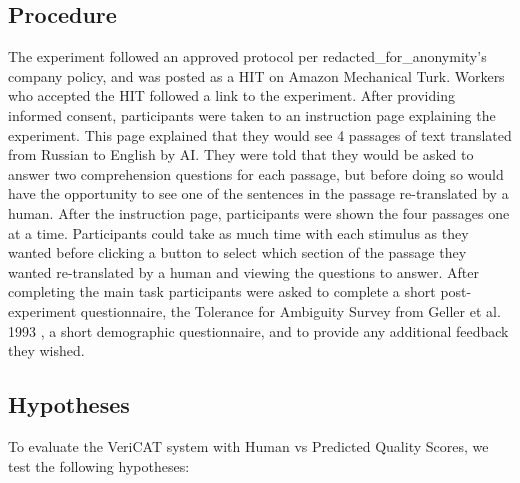 \subsection{Procedure}

The experiment followed an approved protocol per redacted\_for\_anonymity’s company policy, and was posted as a HIT on Amazon Mechanical Turk. Workers who accepted the HIT followed a link to the experiment. After providing informed consent, participants were taken to an instruction page explaining the experiment. This page explained that they would see 4 passages of text translated from Russian to English by AI. They were told that they would be asked to answer two comprehension questions for each passage, but before doing so would have the opportunity to see one of the sentences in the passage re-translated by a human. After the instruction page, participants were shown the four passages one at a time. Participants could take as much time with each stimulus as they wanted before clicking a button to select which section of the passage they wanted re-translated by a human and viewing the questions to answer. After completing the main task participants were asked to complete a short post-experiment questionnaire, the Tolerance for Ambiguity Survey from Geller et al. 1993 \cite{gellerTolerance1993}, a short demographic questionnaire, and to provide any additional feedback they wished.

\subsection{Hypotheses}


To evaluate the VeriCAT system with Human vs Predicted Quality Scores, we test the following hypotheses:

